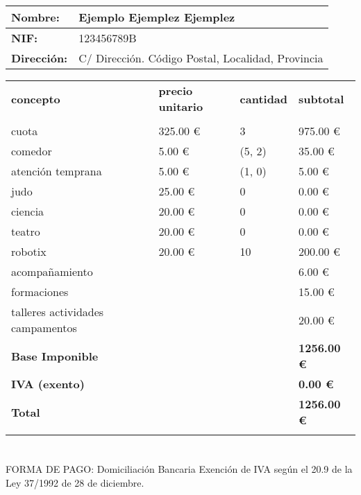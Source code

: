 \documentclass{article}%
\begin{document}
%
\normalsize%
\vspace*{8ex}%
\renewcommand{\arraystretch}{1.5}%
\begin{tabular}{l|l}%
\textbf{Nombre:}&Ejemplo Ejemplez Ejemplez\\%
\hline%
\textbf{NIF:}&123456789B\\%
\hline%
\textbf{Dirección:}&C/ Dirección. Código Postal, Localidad, Provincia\\%
\hline%
\end{tabular}%
\vspace*{8ex}%
\renewcommand{\arraystretch}{1.5}%
\begin{longtabu}{X[3l] X[c] X[c] X[c]}%
%
\textbf{concepto}&\textbf{precio unitario}&\textbf{cantidad}&\textbf{subtotal}\\%
&&&\\%
\hline%
cuota&325.00 €&3&975.00 €\\%
\hline%
comedor&5.00 €&(5, 2)&35.00 €\\%
\hline%
atención temprana&5.00 €&(1, 0)&5.00 €\\%
\hline%
judo&25.00 €&0&0.00 €\\%
\hline%
ciencia&20.00 €&0&0.00 €\\%
\hline%
teatro&20.00 €&0&0.00 €\\%
\hline%
robotix&20.00 €&10&200.00 €\\%
\hline%
acompañamiento&&&6.00 €\\%
\hline%
formaciones&&&15.00 €\\%
\hline%
talleres actividades campamentos&&&20.00 €\\%
\hline%
\textbf{Base Imponible}&&&\textbf{1256.00 €}\\%
\hline%
\textbf{IVA (exento)}&&&\textbf{0.00 €}\\%
\hline%
\textbf{Total}&&&\textbf{1256.00 €}\\%
\vspace*{10ex}%
\end{longtabu}%
\section*{}%
\label{sec:}%
FORMA DE PAGO: Domiciliación Bancaria\newline%
%
Exención de IVA según el 20.9 de la Ley 37/1992 de 28 de diciembre.

%
\pagestyle{firstpage}%
\end{document}
